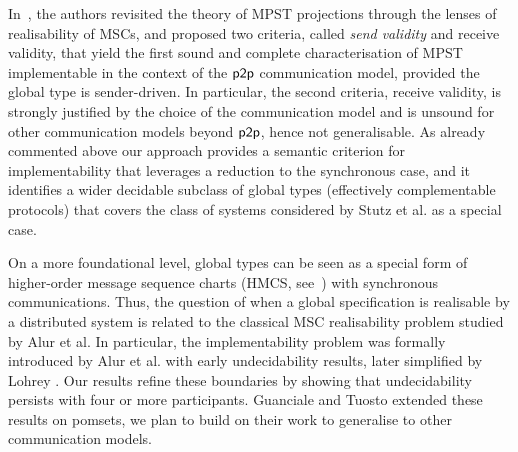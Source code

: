 In~\cite{DBLP:conf/cav/LiSWZ23,DBLP:conf/ecoop/Stutz23}, the authors revisited
the theory of MPST projections through the lenses of realisability
of MSCs, and proposed two criteria, called \emph{send validity} and {receive validity},
that yield the first sound and complete
characterisation of MPST implementable in the context of
the $\mathsf{p2p}$ communication model, provided the global type is sender-driven.
In particular, the second criteria, receive validity,
is strongly justified by the choice of the communication model and is unsound for
other communication models beyond $\mathsf{p2p}$, hence not generalisable. As already commented above %
 our approach provides a semantic criterion for implementability that leverages a reduction to the synchronous case, and it identifies a wider decidable subclass of global types (effectively complementable protocols) that covers the class of systems considered by Stutz et al. as a special case. 
 
On a more foundational level, global types can be seen as a special form of higher-order message sequence charts (HMCS, see~\cite{DBLP:journals/tcs/AlurEY05}) with synchronous communications. 
Thus, the question of when a global specification is realisable by a distributed system is related to the classical MSC realisability problem studied by Alur et al. In particular, the implementability problem was formally introduced by Alur et al. \cite{DBLP:journals/tcs/AlurEY05} with early undecidability results, later simplified by Lohrey \cite{DBLP:journals/tcs/Lohrey03}. Our results refine these boundaries by showing that undecidability persists with four or more participants.
Guanciale and Tuosto \cite{DBLP:journals/jlap/GuancialeT19} extended these results on pomsets, we plan to build on their work to generalise to other communication models.



%



